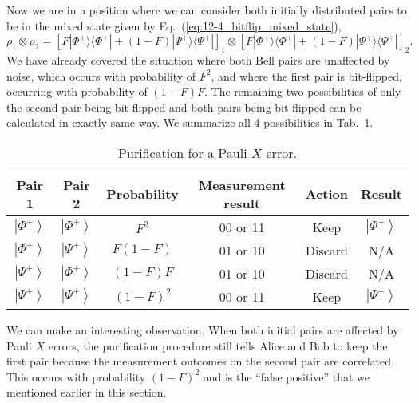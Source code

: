 Now we are in a position where we can consider both initially distributed pairs to be in the mixed state given by Eq.~(\ref{eq:12-4_bitflip_mixed_state}),
\begin{equation}
    \rho_1 \otimes \rho_2 = \left[ F |\Phi^+\rangle \langle\Phi^+| + (1 - F) |\Psi^+\rangle \langle\Psi^+| \right]_1 \otimes \left[ F |\Phi^+\rangle \langle\Phi^+| + (1 - F) |\Psi^+\rangle \langle\Psi^+| \right]_2.
\end{equation}
We have already covered the situation where both Bell pairs are unaffected by noise, which occurs with probability of $F^2$, and where the first pair is bit-flipped, occurring with probability of $(1-F)F$.
The remaining two possibilities of only the second pair being bit-flipped and both pairs being bit-flipped can be calculated in exactly same way.
We summarize all 4 possibilities in Tab.~\ref{tab:12-4_purification_X_error}.
\begin{table}[t]
    \setcellgapes{3pt}
    \renewcommand\theadfont{}
    \makegapedcells
    \centering
    \begin{tabular}{cccccc}
        \hline
        \textbf{Pair 1} & \textbf{Pair 2} & \textbf{Probability} & \textbf{Measurement result} & \textbf{Action} & \textbf{Result} \\
        \hline
        $\left|\Phi^{+}\right\rangle$ & $\left|\Phi^{+}\right\rangle$ & $F^{2}$ & 00 or 11 & \textcolor{mygreen}{Keep} & $\left|\Phi^{+}\right\rangle$ \\
        $\left|\Phi^{+}\right\rangle$ & $\left|\Psi^{+}\right\rangle$ & $F(1-F)$ & 01 or 10 & \textcolor{myred}{Discard} & N/A \\
        $\left|\Psi^{+}\right\rangle$ & $\left|\Phi^{+}\right\rangle$ & $(1-F) F$ & 01 or 10 & \textcolor{myred}{Discard} & N/A \\
        $\left|\Psi^{+}\right\rangle$ & $\left|\Psi^{+}\right\rangle$ & $(1-F)^{2}$ & 00 or 11 & \textcolor{mygreen}{Keep} & $\left|\Psi^{+}\right\rangle$ \\
        \hline
    \end{tabular}
    \caption[X error purification]{Purification for a Pauli $X$ error.}
    \label{tab:12-4_purification_X_error}
\end{table}

We can make an interesting observation.
When both initial pairs are affected by Pauli $X$ errors, the purification procedure still tells Alice and Bob to keep the first pair because the measurement outcomes on the second pair are correlated.
This occurs with probability $(1-F)^2$ and is the ``false positive'' that we mentioned earlier in this section.

